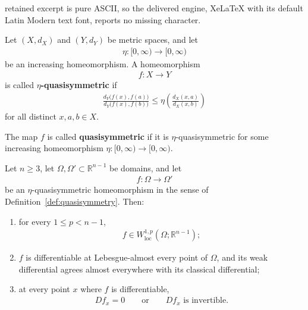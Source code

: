 \documentclass[10pt,a4paper]{amsart}
\newcommand{\R}{\mathbb R}
\begin{document}
retained excerpt is pure ASCII, so the delivered engine, XeLaTeX with its default Latin Modern text font, reports no missing character.
\begin{definition}\label{def:quasisymmetry}
Let \((X,d_X)\) and \((Y,d_Y)\) be metric spaces, and let
\begin{align}
\eta:[0,\infty)\longrightarrow[0,\infty)
\nonumber
\end{align}
be an increasing homeomorphism. A homeomorphism
\begin{align}
f:X\longrightarrow Y
\nonumber
\end{align}
is called \textbf{\(\eta\)-quasisymmetric} if
\begin{align}
\frac{d_Y\bigl(f(x),f(a)\bigr)}
     {d_Y\bigl(f(x),f(b)\bigr)}
\leq
\eta\!\left(
\frac{d_X(x,a)}{d_X(x,b)}
\right)
\label{eq:metric-quasisymmetry}
\end{align}
for all distinct \(x,a,b\in X\).

The map \(f\) is called \textbf{quasisymmetric} if it is
\(\eta\)-quasisymmetric for some increasing homeomorphism
\(\eta:[0,\infty)\to[0,\infty)\).
\end{definition}

\begin{proposition}\label{prop:elementary_qs_regular}
Let \(n\geq3\), let \(\Omega,\Omega'\subset\R^{n-1}\) be domains, and let
\begin{align}
f:\Omega\longrightarrow\Omega'\nonumber
\end{align}
be an \(\eta\)-quasisymmetric homeomorphism in the sense of
Definition~\ref{def:quasisymmetry}.  Then:
\begin{enumerate}[label=\textup{(\roman*)},leftmargin=3em]
\item
for every \(1\leq p<n-1\),
\begin{align}
f\in W^{1,p}_{\mathrm{loc}}(\Omega;\R^{n-1});\nonumber
\end{align}
\item
\(f\) is differentiable at Lebesgue-almost every point of
\(\Omega\), and its weak differential agrees almost everywhere with its
classical differential;
\item
at every point \(x\) where \(f\) is   differentiable,
\begin{align}
Df_x=0
\qquad\text{or}\qquad
Df_x\text{ is invertible}.
\label{eq:zero_or_invertible}
\end{align}
\end{enumerate}
\end{proposition}
\end{document}
